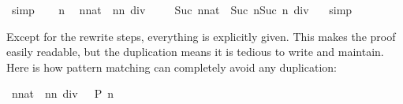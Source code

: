 \begin{isabellebody}
\ simp\isanewline
{}\isamarkupfalse%
\isanewline
\ \ \isamarkupfalse%
\ n\ \isamarkupfalse%
\ {}{}{}{}{}{}n{}{}nat{}\ {}\ n{}{}n{}{}{}\ div\ {}{}\isanewline
\ \ \isamarkupfalse%
\ {}{}{}{}{}{}Suc\ n{}{}nat{}\ {}\ Suc\ n{}{}Suc\ n{}{}{}\ div\ {}{}\ \isamarkupfalse%
\ simp\isanewline
{}\isamarkupfalse%
%
\endisatagproof
{\isafoldproof}%
%
\isadelimproof
%
\endisadelimproof
%
\begin{isamarkuptext}%
Except for the rewrite steps, everything is explicitly given. This
makes the proof easily readable, but the duplication means it is tedious to
write and maintain. Here is how pattern
matching can completely avoid any duplication:%
\end{isamarkuptext}%
\isamarkuptrue%
\isamarkupfalse%
\ {}{}{}{}{}{}n{}{}nat{}\ {}\ n{}{}n{}{}{}\ div\ {}{}\ {}\ {}{}P\ n{}{}\isanewline

\end{isabellebody}
